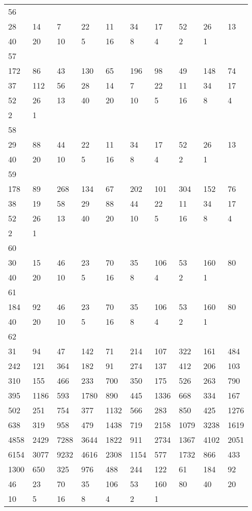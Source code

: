 \begin{longtable}{*{10}{l}}
56&&&&&&&&&\\
28& 14& 7& 22& 11& 34& 17& 52& 26& 13\\
40& 20& 10& 5& 16& 8& 4& 2& 1& \\

57&&&&&&&&&\\
172& 86& 43& 130& 65& 196& 98& 49& 148& 74\\
37& 112& 56& 28& 14& 7& 22& 11& 34& 17\\
52& 26& 13& 40& 20& 10& 5& 16& 8& 4\\
2& 1& \\

58&&&&&&&&&\\
29& 88& 44& 22& 11& 34& 17& 52& 26& 13\\
40& 20& 10& 5& 16& 8& 4& 2& 1& \\

59&&&&&&&&&\\
178& 89& 268& 134& 67& 202& 101& 304& 152& 76\\
38& 19& 58& 29& 88& 44& 22& 11& 34& 17\\
52& 26& 13& 40& 20& 10& 5& 16& 8& 4\\
2& 1& \\

60&&&&&&&&&\\
30& 15& 46& 23& 70& 35& 106& 53& 160& 80\\
40& 20& 10& 5& 16& 8& 4& 2& 1& \\

61&&&&&&&&&\\
184& 92& 46& 23& 70& 35& 106& 53& 160& 80\\
40& 20& 10& 5& 16& 8& 4& 2& 1& \\

62&&&&&&&&&\\
31& 94& 47& 142& 71& 214& 107& 322& 161& 484\\
242& 121& 364& 182& 91& 274& 137& 412& 206& 103\\
310& 155& 466& 233& 700& 350& 175& 526& 263& 790\\
395& 1186& 593& 1780& 890& 445& 1336& 668& 334& 167\\
502& 251& 754& 377& 1132& 566& 283& 850& 425& 1276\\
638& 319& 958& 479& 1438& 719& 2158& 1079& 3238& 1619\\
4858& 2429& 7288& 3644& 1822& 911& 2734& 1367& 4102& 2051\\
6154& 3077& 9232& 4616& 2308& 1154& 577& 1732& 866& 433\\
1300& 650& 325& 976& 488& 244& 122& 61& 184& 92\\
46& 23& 70& 35& 106& 53& 160& 80& 40& 20\\
10& 5& 16& 8& 4& 2& 1& \\


\end{longtable}
